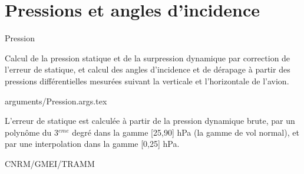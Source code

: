%
\section{Pressions et angles d'incidence }

 {\sf Pression}

Calcul de la pression statique et de la 
surpression dynamique par correction  de l'erreur de 
statique, et 
calcul des angles d'incidence et de d\'erapage \`a 
partir des pressions diff\'erentielles mesur\'ees suivant
la verticale et l'horizontale de l'avion. \newline

\bigskip
 {arguments/Pression.args.tex}





L'erreur de statique est calcul\'ee \`a partir de
la pression dynamique brute, par un polyn\^ome du 3$^{eme}$
degr\'e dans la gamme [25,90] hPa (la gamme de vol normal), et
par une interpolation dans la gamme [0,25] hPa.


CNRM/GMEI/TRAMM


